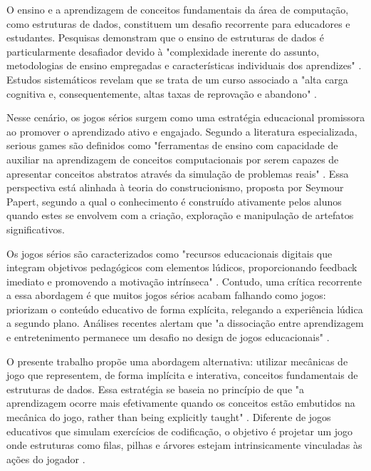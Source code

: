 O ensino e a aprendizagem de conceitos fundamentais da área de computação, como estruturas de dados, constituem um desafio recorrente para educadores e estudantes. Pesquisas demonstram que o ensino de estruturas de dados é particularmente desafiador devido à "complexidade inerente do assunto, metodologias de ensino empregadas e características individuais dos aprendizes" \cite{ajol_2024}. Estudos sistemáticos revelam que se trata de um curso associado a "alta carga cognitiva e, consequentemente, altas taxas de reprovação e abandono" \cite{ajol_2024}.

Nesse cenário, os jogos sérios surgem como uma estratégia educacional promissora ao promover o aprendizado ativo e engajado. Segundo a literatura especializada, serious games são definidos como "ferramentas de ensino com capacidade de auxiliar na aprendizagem de conceitos computacionais por serem capazes de apresentar conceitos abstratos através da simulação de problemas reais" \cite{jose_ifsuldeminas_2024}. Essa perspectiva está alinhada à teoria do construcionismo, proposta por Seymour Papert, segundo a qual o conhecimento é construído ativamente pelos alunos quando estes se envolvem com a criação, exploração e manipulação de artefatos significativos.

Os jogos sérios são caracterizados como "recursos educacionais digitais que integram objetivos pedagógicos com elementos lúdicos, proporcionando feedback imediato e promovendo a motivação intrínseca" \cite{scielo_2022}. Contudo, uma crítica recorrente a essa abordagem é que muitos jogos sérios acabam falhando como jogos: priorizam o conteúdo educativo de forma explícita, relegando a experiência lúdica a segundo plano. Análises recentes alertam que "a dissociação entre aprendizagem e entretenimento permanece um desafio no design de jogos educacionais" \cite{seer_ufrgs_2024}.

O presente trabalho propõe uma abordagem alternativa: utilizar mecânicas de jogo que representem, de forma implícita e interativa, conceitos fundamentais de estruturas de dados. Essa estratégia se baseia no princípio de que "a aprendizagem ocorre mais efetivamente quando os conceitos estão embutidos na mecânica do jogo, rather than being explicitly taught" \cite{jose_ifsuldeminas_2024}. Diferente de jogos educativos que simulam exercícios de codificação, o objetivo é projetar um jogo onde estruturas como filas, pilhas e árvores estejam intrinsicamente vinculadas às ações do jogador \cite{scielo_2022}.

